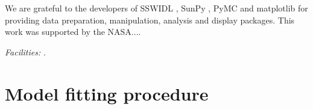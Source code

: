 \documentclass[manuscript]{../aastex52/aastex}
\begin{document}
\acknowledgments

We are grateful to the developers of SSWIDL \cite{}, SunPy \cite{},
PyMC \cite{} and matplotlib \cite{} for providing data preparation,
manipulation, analysis and display packages.  This work was supported
by the NASA....



{\it Facilities:} .



\appendix

\section{Model fitting procedure}\label{sec:app:ind}
\end{document}

